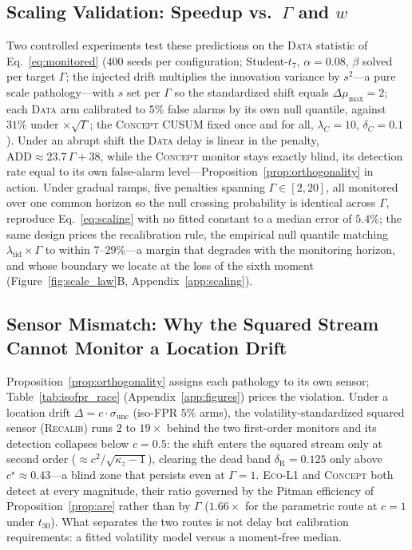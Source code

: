 \documentclass[sigconf,anonymous,review]{acmart}
\theoremstyle{acmdefinition}
\begin{document}
\subsection{Scaling Validation: Speedup vs.\ \texorpdfstring{$\Gamma$}{Gamma} and \texorpdfstring{$w$}{w}}\label{sec:scaling_validation}

Two controlled experiments test these predictions on the \textsc{Data} statistic of Eq.~\eqref{eq:monitored} ($400$ seeds per configuration; Student-$t_7$, $\alpha = 0.08$, $\beta$ solved per target $\Gamma$; the injected drift multiplies the innovation variance by $s^2$---a pure scale pathology---with $s$ set per $\Gamma$ so the standardized shift equals $\Delta\mu_{\max} = 2$; each \textsc{Data} arm calibrated to $5\%$ false alarms by its own null quantile, against $31\%$ under $\times\sqrt{\Gamma}$; the \textsc{Concept} CUSUM fixed once and for all, $\lambda_C = 10$, $\delta_C = 0.1$). Under an abrupt shift the \textsc{Data} delay is linear in the penalty, $\mathrm{ADD} \approx 23.7\,\Gamma + 38$, while the \textsc{Concept} monitor stays exactly blind, its detection rate equal to its own false-alarm level---Proposition~\ref{prop:orthogonality} in action. Under gradual ramps, five penalties spanning $\Gamma \in [2, 20]$, all monitored over one common horizon so the null crossing probability is identical across $\Gamma$, reproduce Eq.~\eqref{eq:scaling} with no fitted constant to a median error of $5.4\%$; the same design prices the recalibration rule, the empirical null quantile matching $\lambda_{\mathrm{iid}} \times \Gamma$ to within $7$--$29\%$---a margin that degrades with the monitoring horizon, and whose boundary we locate at the loss of the sixth moment (Figure~\ref{fig:scale_law}B, Appendix~\ref{app:scaling}).

\subsection{Sensor Mismatch: Why the Squared Stream Cannot Monitor a Location Drift}\label{sec:magnitude}

Proposition~\ref{prop:orthogonality} assigns each pathology to its own sensor; Table~\ref{tab:isofpr_race} (Appendix~\ref{app:figures}) prices the violation. Under a location drift $\Delta = c \cdot \sigma_{\mathrm{unc}}$ (iso-FPR $5\%$ arms), the volatility-standardized squared sensor (\textsc{Recalib}) runs $2$ to $19\times$ behind the two first-order monitors and its detection collapses below $c = 0.5$: the shift enters the squared stream only at second order ($\approx c^2/\sqrt{\kappa_z-1}$), clearing the dead band $\delta_{\mathrm{R}} = 0.125$ only above $c^{\star} \approx 0.43$---a blind zone that persists even at $\Gamma = 1$. \textsc{Eco-L1} and \textsc{Concept} both detect at every magnitude, their ratio governed by the Pitman efficiency of Proposition~\ref{prop:are} rather than by $\Gamma$ ($1.66\times$ for the parametric route at $c = 1$ under $t_{30}$). What separates the two routes is not delay but calibration requirements: a fitted volatility model versus a moment-free median.
\end{document}
